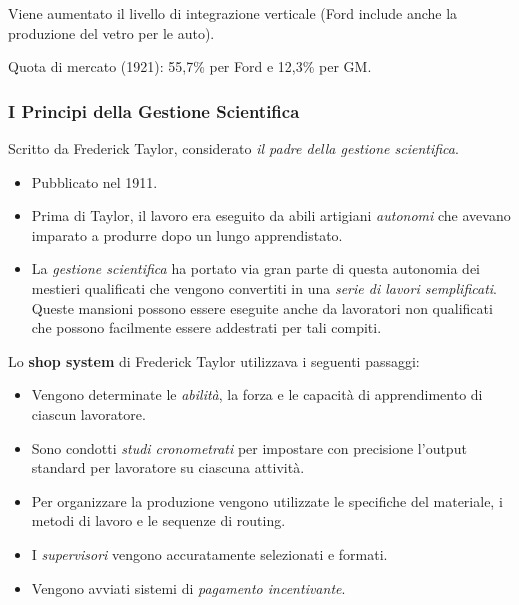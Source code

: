 \documentclass[a4paper,portrait,12pt]{article}
\theoremstyle{definition}
\begin{document}

Viene aumentato il livello di integrazione verticale (Ford include anche la produzione del vetro per le auto).

Quota di mercato (1921): 55,7\% per Ford e 12,3\% per GM.

\subsubsection{I Principi della Gestione Scientifica}
Scritto da Frederick Taylor, considerato \emph{il padre della gestione scientifica}.
\begin{itemize}
\item Pubblicato nel 1911.
\item Prima di Taylor, il lavoro era eseguito da abili artigiani \emph{autonomi} che avevano imparato a produrre dopo un lungo apprendistato.
\item La \emph{gestione scientifica} ha portato via gran parte di questa autonomia dei mestieri qualificati che vengono convertiti in una \emph{serie di lavori semplificati}.
Queste mansioni possono essere eseguite anche da lavoratori non qualificati che possono facilmente essere addestrati per tali compiti.
\end{itemize}

\noindent
Lo \textbf{shop system} di Frederick Taylor utilizzava i seguenti passaggi:
\begin{itemize}
\item Vengono determinate le \emph{abilità}, la forza e le capacità di apprendimento di ciascun lavoratore.
\item Sono condotti \emph{studi cronometrati} per impostare con precisione l'output standard per lavoratore su ciascuna attività.
\item Per organizzare la produzione vengono utilizzate le specifiche del materiale, i metodi di lavoro e le sequenze di routing.
\item I \emph{supervisori} vengono accuratamente selezionati e formati.
\item Vengono avviati sistemi di \emph{pagamento incentivante}.
\end{itemize}
\end{document}
